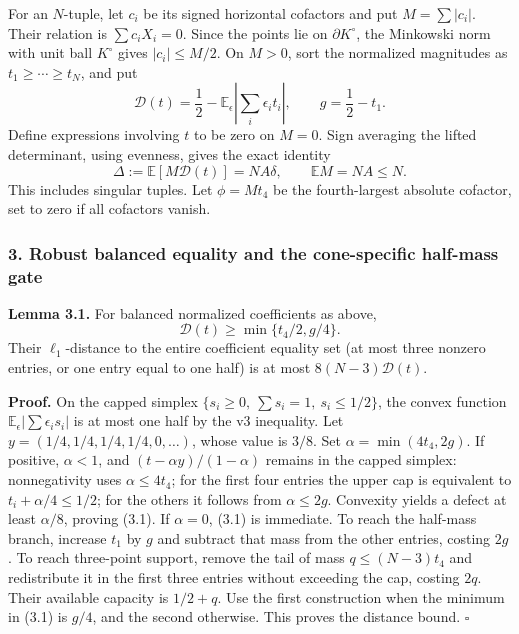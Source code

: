 \documentclass[
  11pt,
]{article}
\begin{document}
For an \(N\)-tuple, let \(c_i\) be its signed horizontal cofactors and
put \(M=\sum|c_i|\). Their relation is \(\sum c_iX_i=0\). Since the
points lie on \(\partial K^\circ\), the Minkowski norm with unit ball
\(K^\circ\) gives \(|c_i|\le M/2\). On \(M>0\), sort the normalized
magnitudes as \(t_1\ge\cdots\ge t_N\), and put \[
 \mathscr D(t)=\frac12-
        \mathbb E_\epsilon\left|\sum_i\epsilon_i t_i\right|,
 \qquad g=\frac12-t_1.
\] Define expressions involving \(t\) to be zero on \(M=0\). Sign
averaging the lifted determinant, using evenness, gives the exact
identity \[
 \Delta:=\mathbb E[M\mathscr D(t)]=NA\delta,
 \qquad \mathbb E M=NA\le N.                                   \tag{2.4}
\] This includes singular tuples. Let \(\phi=Mt_4\) be the
fourth-largest absolute cofactor, set to zero if all cofactors vanish.

\subsubsection{3. Robust balanced equality and the cone-specific
half-mass
gate}\label{robust-balanced-equality-and-the-cone-specific-half-mass-gate}

\textbf{Lemma 3.1.} For balanced normalized coefficients as above, \[
 \mathscr D(t)\ge\min\{t_4/2,g/4\}.                             \tag{3.1}
\] Their \(\ell_1\)-distance to the entire coefficient equality set (at
most three nonzero entries, or one entry equal to one half) is at most
\(8(N-3)\mathscr D(t)\).

\textbf{Proof.} On the capped simplex
\(\{s_i\ge0,\ \sum s_i=1,\ s_i\le1/2\}\), the convex function
\(\mathbb E_\epsilon|\sum\epsilon_i s_i|\) is at most one half by the v3
inequality. Let \(y=(1/4,1/4,1/4,1/4,0,\ldots)\), whose value is
\(3/8\). Set \(\alpha=\min(4t_4,2g)\). If positive, \(\alpha<1\), and
\((t-\alpha y)/(1-\alpha)\) remains in the capped simplex: nonnegativity
uses \(\alpha\le4t_4\); for the first four entries the upper cap is
equivalent to \(t_i+\alpha/4\le1/2\); for the others it follows from
\(\alpha\le2g\). Convexity yields a defect at least \(\alpha/8\),
proving (3.1). If \(\alpha=0\), (3.1) is immediate. To reach the
half-mass branch, increase \(t_1\) by \(g\) and subtract that mass from
the other entries, costing \(2g\). To reach three-point support, remove
the tail of mass \(q\le(N-3)t_4\) and redistribute it in the first three
entries without exceeding the cap, costing \(2q\). Their available
capacity is \(1/2+q\). Use the first construction when the minimum in
(3.1) is \(g/4\), and the second otherwise. This proves the distance
bound. \(\square\)
\end{document}
